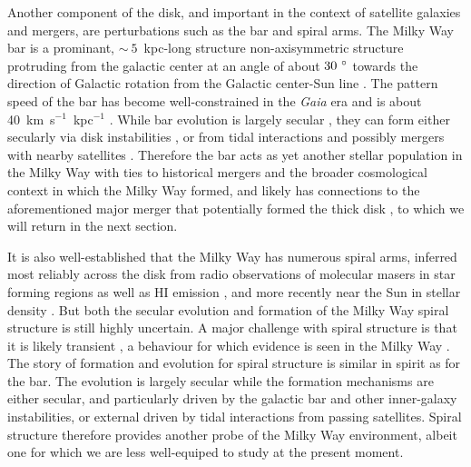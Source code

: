 Another component of the disk, and important in the context of satellite galaxies and mergers, are perturbations such as the bar and spiral arms. The Milky Way bar is a prominant, $\sim~5$~kpc-long structure non-axisymmetric structure protruding from the galactic center at an angle of about $30~\hbox{$^\circ$}$ towards the direction of Galactic rotation from the Galactic center-Sun line \parencite{wegg15}. The pattern speed of the bar has become well-constrained in the \textit{Gaia} era and is about 40~km~s$^{-1}$~kpc$^{-1}$ \parencite[e.g.][]{bovy19,sanders19}. While bar evolution is largely secular \parencite{athanassoula03}, they can form either secularly via disk instabilities \parencite{ostriker73}, or from tidal interactions and possibly mergers with nearby satellites \parencite{noguchi87,gerin90}. Therefore the bar acts as yet another stellar population in the Milky Way with ties to historical mergers and the broader cosmological context in which the Milky Way formed, and likely has connections to the aforementioned major merger that potentially formed the thick disk \parencite{fragkoudi20,merrow23}, to which we will return in the next section.

It is also well-established that the Milky Way has numerous spiral arms, inferred most reliably across the disk from radio observations of molecular masers in star forming regions as well as HI emission \parencite{levine06,reid14,reid19}, and more recently near the Sun in stellar density \parencite{eilers19}. But both the secular evolution and formation of the Milky Way spiral structure is still highly uncertain. A major challenge with spiral structure is that it is likely transient \parencite[][reviews secular disk evolution, including the transient spiral structure]{sellwood14}, a behaviour for which evidence is seen in the Milky Way \parencite{hunt18,sellwood19}. The story of formation and evolution for spiral structure is similar in spirit as for the bar. The evolution is largely secular while the formation mechanisms are either secular, and particularly driven by the galactic bar and other inner-galaxy instabilities, or external driven by tidal interactions from passing satellites. Spiral structure therefore provides another probe of the Milky Way environment, albeit one for which we are less well-equiped to study at the present moment.

